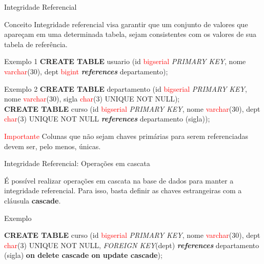 \documentclass[xcolor=x11names,compress]{beamer}
\begin{document}
\begin{frame}[allowframebreaks]{Integridade Referencial}

\begin{alertblock}{Conceito}
Integridade referencial visa garantir que um conjunto de valores que apareçam em uma determinada tabela, sejam consistentes com os valores de sua tabela de referência. 
\end{alertblock}

\begin{alertblock}{Exemplo 1}
\textbf{CREATE TABLE} usuario (id \textcolor{red}{bigserial} \textit{PRIMARY KEY}, nome \textcolor{red}{varchar}(30), dept \textcolor{red}{bigint} \textit{\textbf{references}} departamento);
\end{alertblock}

\begin{alertblock}{Exemplo 2}
\textbf{CREATE TABLE} departamento (id \textcolor{red}{bigserial} \textit{PRIMARY KEY}, nome \textcolor{red}{varchar}(30), sigla \textcolor{red}{char}(3) UNIQUE NOT NULL); \\[5mm]

\textbf{CREATE TABLE} curso (id \textcolor{red}{bigserial} \textit{PRIMARY KEY}, nome \textcolor{red}{varchar}(30), dept \textcolor{red}{char}(3) UNIQUE NOT NULL \textit{\textbf{references}} departamento (sigla));
\end{alertblock}

\begin{alertblock}{\textcolor{red}{Importante}}
Colunas que não sejam chaves primárias para serem referenciadas devem ser, pelo menos, únicas. 
\end{alertblock}

\end{frame}

\begin{frame}{Integridade Referencial: Operações em cascata}

É possível realizar operações em cascata na base de dados para manter a integridade referencial. Para isso, basta definir as chaves estrangeiras com a cláusula \textbf{cascade}. 

\begin{alertblock}{Exemplo}

\textbf{CREATE TABLE} curso (id \textcolor{red}{bigserial} \textit{PRIMARY KEY}, nome \textcolor{red}{varchar}(30), dept \textcolor{red}{char}(3) UNIQUE NOT NULL, \textit{FOREIGN KEY}(dept) \textit{\textbf{references}} departamento (sigla) \textbf{on delete cascade on update cascade});
\end{alertblock}

\end{frame}
\end{document}

